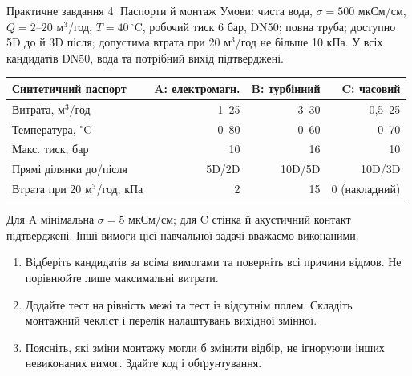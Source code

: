 \documentclass[aspectratio=169,11pt]{beamer}
\begin{document}
\begin{frame}{Практичне завдання 4. Паспорти й монтаж}
\scriptsize
Умови: чиста вода, $\sigma=500$ мкСм/см, $Q=2$--$20$ м$^3$/год, $T=40\,^{\circ}$C, робочий тиск 6 бар, DN50; повна труба; доступно 5D до й 3D після; допустима втрата при 20 м$^3$/год не більше 10 кПа. У всіх кандидатів DN50, вода та потрібний вихід підтверджені.
\begin{center}
\begin{tabular}{lrrr}
\toprule Синтетичний паспорт & A: електромагн. & B: турбінний & C: часовий\\\midrule
Витрата, м$^3$/год & 1--25 & 3--30 & 0,5--25\\
Температура, $^{\circ}$C & 0--80 & 0--60 & 0--70\\
Макс. тиск, бар & 10 & 16 & 10\\
Прямі ділянки до/після & 5D/2D & 10D/5D & 10D/3D\\
Втрата при 20 м$^3$/год, кПа & 2 & 15 & 0 (накладний)\\\bottomrule
\end{tabular}
\end{center}
Для A мінімальна $\sigma=5$ мкСм/см; для C стінка й акустичний контакт підтверджені. Інші вимоги цієї навчальної задачі вважаємо виконаними.
\begin{enumerate}
\item Відберіть кандидатів за всіма вимогами та поверніть всі причини відмов. Не порівнюйте лише максимальні витрати.
\item Додайте тест на рівність межі та тест із відсутнім полем. Складіть монтажний чекліст і перелік налаштувань вихідної змінної.
\item Поясніть, які зміни монтажу могли б змінити відбір, не ігноруючи інших невиконаних вимог. Здайте код і обґрунтування.
\end{enumerate}
\end{frame}
\end{document}
